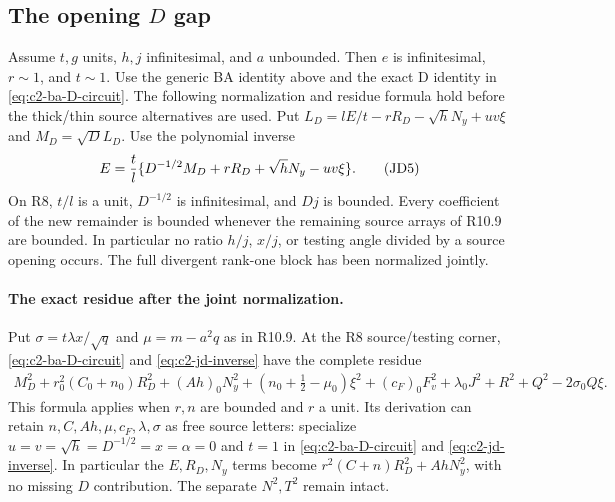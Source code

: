 \subsection{The opening $D$ gap}
\label{component:pe07041e033da}
\label{pe07041e033da:sec:r17-R8-joint-D}
Assume $t,g$ units, $h,j$ infinitesimal, and $a$ unbounded. Then
$e$ is infinitesimal, $r\sim1$, and $t\sim1$. Use the generic BA
identity above and the exact D identity in
\eqref{eq:c2-ba-D-circuit}. The following normalization and residue
formula hold before the thick/thin source alternatives are used.
Put $L_D=lE/t-rR_D-\sqrt hN_y+uv\xi$ and $M_D=\sqrt D L_D$.
Use the polynomial inverse
\[
 E={t\over l}\{D^{-1/2}M_D+rR_D+\sqrt hN_y-uv\xi\}. \tag{JD5}\label{eq:c2-jd-inverse}
\]
On R8, $t/l$ is a unit, $D^{-1/2}$ is infinitesimal, and $Dj$ is
bounded.  Every coefficient of the new remainder is bounded whenever
the remaining source arrays of R10.9 are bounded.  In particular no
ratio $h/j$, $x/j$, or testing angle divided by a source opening occurs.
The full divergent rank-one block has been normalized jointly.

\paragraph{The exact residue after the joint normalization.}
Put $\sigma=t\lambda x/\sqrt q$ and $\mu=m-a^2q$ as in R10.9.
At the R8 source/testing corner, \eqref{eq:c2-ba-D-circuit} and \eqref{eq:c2-jd-inverse} have the complete residue
\[
 \begin{split}
 M_D^2+r_0^2(C_0+n_0)R_D^2+(Ah)_0N_y^2
  +(n_0+\tfrac12-\mu_0)\xi^2
  +(c_F)_0F_v^2+\lambda_0J^2+R^2+Q^2-2\sigma_0Q\xi.
 \end{split}                                                   \tag{JD6}
\]
This formula applies when $r,n$ are bounded and $r$ a unit.  Its
derivation can retain $n,C,Ah,\mu,c_F,\lambda,\sigma$ as free source
letters: specialize $u=v=\sqrt h=D^{-1/2}=x=\alpha=0$ and $t=1$
in \eqref{eq:c2-ba-D-circuit} and \eqref{eq:c2-jd-inverse}.  In particular the $E,R_D,N_y$ terms become
$r^2(C+n)R_D^2+AhN_y^2$, with no missing $D$ contribution.
The separate $N^2,T^2$ remain intact.

